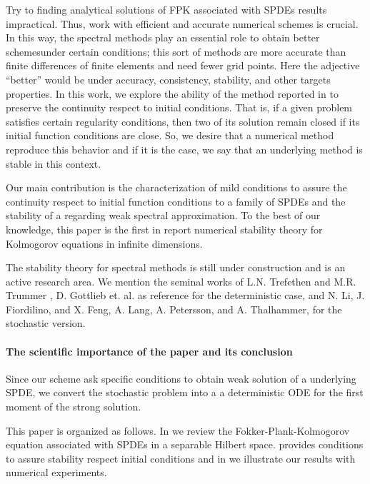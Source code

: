 \documentclass[review,onefignum,onetabnum]{siamart190516}
\begin{document}
    Try to finding analytical solutions of FPK associated with SPDEs results
impractical. Thus, work with efficient and accurate numerical schemes is 
crucial. In this way, the spectral methods play an essential role to obtain 
better schemes\textemdash under certain conditions; this sort of methods are 
more accurate than finite differences of finite elements and need fewer grid 
points. Here the adjective ``better'' would be under accuracy, consistency, 
stability, and other targets properties. In this work, we explore the ability 
of the method reported in \cite{de-fl} to preserve the continuity respect to 
initial conditions. That is, if a given problem satisfies certain regularity 
conditions, then two of its solution remain closed if its initial function 
conditions are close. So, we desire that a numerical method reproduce this 
behavior and if it is the case, we say that an underlying method is stable in 
this context.

    Our main contribution is the characterization of mild conditions to
assure the continuity respect to initial function conditions to a family of
SPDEs and the stability of a regarding weak spectral approximation. 
To the best of our knowledge, this paper is the first in report numerical 
stability theory for Kolmogorov equations in infinite dimensions.

    The stability theory for spectral methods is still under 
construction and is an active research area. We mention the seminal works of
L.N. Trefethen and M.R. Trummer \cite{Trefethen1987}, D. Gottlieb et. al.
\cite{Gottlieb1987a} as reference for the deterministic case, and N. Li, J.
Fiordilino, and X. Feng, \cite{Li2019} A. Lang, A. Petersson,  and A.
Thalhammer, \cite{Lang2017} for the stochastic version.

\paragraph{The scientific importance of the paper and its conclusion}
    Since our scheme ask specific conditions to obtain weak solution
of a underlying SPDE, we convert the stochastic problem into a 
a deterministic ODE for the first moment of the strong solution.



    This paper is organized as follows. In  we review the
Fokker-Plank-Kolmogorov equation associated with SPDEs in
a separable Hilbert space.  
provides conditions to assure stability respect initial conditions and in 
 we illustrate our
results with numerical experiments.
\end{document}
